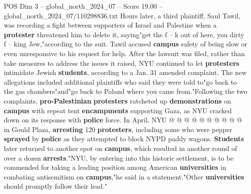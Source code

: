 \begin{textsample}{POS Dim 3 – global\_north\_2024\_07 – Score 19.00 – global\_north\_2024\_07/110298836.txt}
Hours later, a third plaintiff, Saul Tawil, was recording a fight between supporters of Israel and Palestine when a \textbf{protester} threatened him to delete it, saying"get the f -- k out of here, you dirty f -- king Jew,"according to the suit.
Tawil accused \textbf{campus} safety of being slow or even unresponsive to his request for help.
After the lawsuit was filed, rather than take measures to address the issues it raised, NYU continued to let \textbf{protesters} intimidate Jewish \textbf{students}, according to a Jan. 31 amended complaint.
The new allegations included additional plaintiffs who said they were told to"go back to the gas chambers"and"go back to Poland where you came from."Following the two complaints, \textbf{pro-Palestinian} \textbf{protesters} ratcheted up \textbf{demonstrations} on \textbf{campus} with repeat tent \textbf{encampments} supporting Gaza, as NYU cracked down on its response with \textbf{police} force.
In April, NYU @ @ @ @ @ @ @ @ @ @ in Gould Plaza, \textbf{arresting} 120 \textbf{protesters}, including some who were pepper \textbf{sprayed} by \textbf{police} as they attempted to block NYPD paddy wagons. \textbf{Students} later returned to another spot on \textbf{campus}, which resulted in another round of over a dozen \textbf{arrests}."NYU, by entering into this historic settlement, is to be commended for taking a leading position among American \textbf{universities} in combating antisemitism on \textbf{campus},"he said in a statement."Other \textbf{universities} should promptly follow their lead."

\end{textsample}
